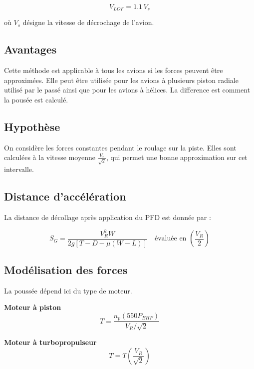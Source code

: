 		\[		V_{LOF} = 1.1 \, V_s		\]
		
		où $V_s$ désigne la vitesse de décrochage de l'avion.
		
			\subsection{Avantages}
			
				Cette méthode est applicable à tous les avions si les forces peuvent être approximées. Elle peut être utilisée pour les avions à plusieurs piston radiale utilisé par le passé ainsi que pour les avions à hélices. La difference est comment la pousée est calculé.
			\vspace{0.3cm}
			
			\subsection{Hypothèse}
			
				On considère les forces constantes pendant le roulage sur la piste. Elles sont calculées à la vitesse moyenne $\frac{V_r}{\sqrt{2}}$, qui permet une bonne approximation sur cet intervalle.
				
				\vspace{0.3cm}
				
			\subsection{Distance d’accélération}
				
				La distance de décollage après application du PFD est donnée par :
				
				\begin{equation*}
					S_G= \frac{ V_R^2 W	}{ 2g[T-D-\mu(W-L)]	}
					\quad
					\text{évaluée en }
					\left(\frac{V_R}{2}\right)
				\end{equation*}
				
				
			\subsection{Modélisation des forces}
			
				La poussée dépend ici du type de moteur.
				
				\vspace{0.3cm}
				
				\textbf{Moteur à piston}				\[ T= 	\frac{n_p(550P_{BHP})	}{	V_R/\sqrt{2}	}	\]
			
				\textbf{Moteur à turbopropulseur}		\[	T=T\left(\frac{V_R}{\sqrt{2}}\right)	\]
			
